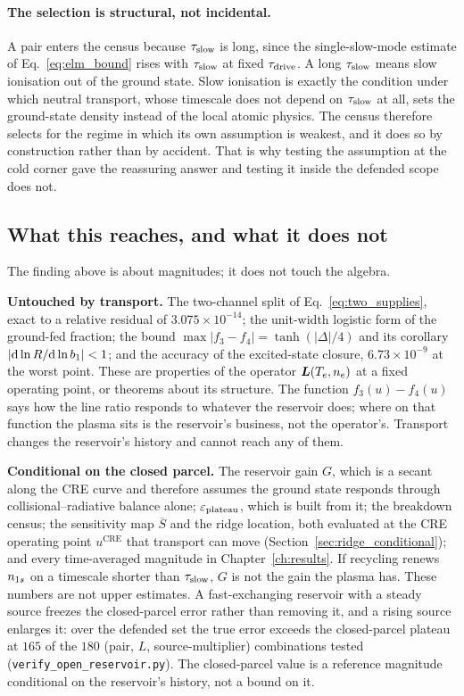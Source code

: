 \paragraph{The selection is structural, not incidental.} A pair enters the
census because $\tau_{\mathrm{slow}}$ is long, since the single-slow-mode estimate of
Eq.~\eqref{eq:elm_bound} rises with $\tau_{\mathrm{slow}}$ at fixed $\tau_{\mathrm{drive}}$. A long
$\tau_{\mathrm{slow}}$ means slow ionisation out of the ground state. Slow ionisation is
exactly the condition under which neutral transport, whose timescale does not
depend on $\tau_{\mathrm{slow}}$ at all, sets the ground-state density instead of the local
atomic physics. The census therefore selects for the regime in which its own
assumption is weakest, and it does so by construction rather than by accident.
That is why testing the assumption at the cold corner gave the reassuring answer
and testing it inside the defended scope does not.

\subsection{What this reaches, and what it does not}
\label{sec:transport_partition}

The finding above is about magnitudes; it does not touch the algebra.

\textbf{Untouched by transport.} The two-channel split of
Eq.~\eqref{eq:two_supplies}, exact to a relative residual of
$3.075\times10^{-14}$; the unit-width logistic form of the ground-fed fraction;
the bound $\max|f_3-f_4| = \tanh(|\Delta|/4)$ and its corollary
$|\mathrm{d}\ln R/\mathrm{d}\ln b_1| < 1$; and the accuracy of the
excited-state closure, $6.73\times10^{-9}$ at the worst point. These are properties of the operator
$\bm{L}(T_e,n_e)$ at a fixed operating point, or theorems about its structure.
The function $f_3(u)-f_4(u)$ says how the line ratio responds to whatever the
reservoir does; where on that function the plasma sits is the reservoir's
business, not the operator's. Transport changes the reservoir's history and
cannot reach any of them.

\textbf{Conditional on the closed parcel.} The reservoir gain $G$, which is
a secant along the CRE curve and therefore assumes the ground
state responds through collisional--radiative balance alone; $\varepsilon_{\mathrm{plateau}}$, which
is built from it; the breakdown census; the sensitivity map $\overline{S}$ and
the ridge location, both evaluated at the CRE operating point
$u^{\mathrm{CRE}}$ that transport can move (Section~\ref{sec:ridge_conditional});
and every time-averaged magnitude in Chapter~\ref{ch:results}. If recycling renews $n_{1s}$ on a timescale shorter than
$\tau_{\mathrm{slow}}$, $G$ is not the gain the plasma has. These numbers are not upper
estimates. A fast-exchanging reservoir with a steady source freezes the
closed-parcel error rather than removing it, and a rising source enlarges it: over
the defended set the true error exceeds the closed-parcel plateau at $165$ of the
$180$ (pair, $L$, source-multiplier) combinations tested
(\texttt{verify\_open\_reservoir.py}). The closed-parcel value is a reference
magnitude conditional on the reservoir's history, not a bound on it.

